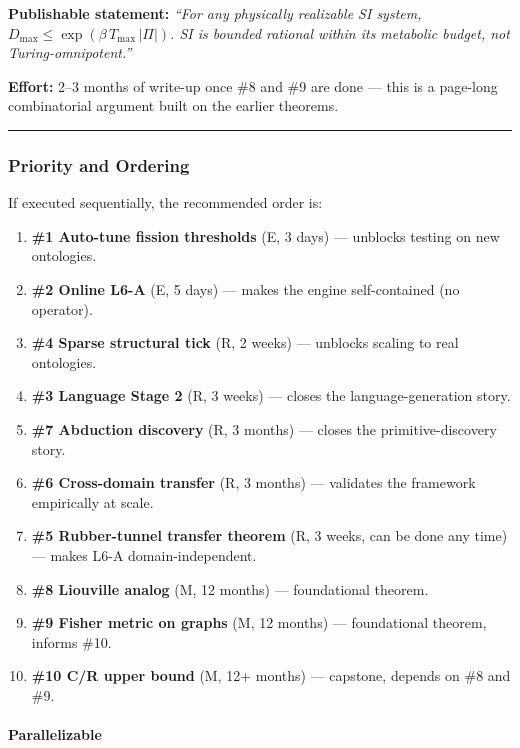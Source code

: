 \documentclass[
  11pt,
  a4paper,
]{article}
\providecommand{\tightlist}{%
  \setlength{\itemsep}{0pt}\setlength{\parskip}{0pt}}
\begin{document}
\textbf{Publishable statement:} \emph{``For any physically realizable SI
system, \(D_\text{max} \leq \exp(\beta \, T_\text{max} \, |\Pi|)\). SI
is bounded rational within its metabolic budget, not
Turing-omnipotent.''}

\textbf{Effort:} 2--3 months of write-up once \#8 and \#9 are done ---
this is a page-long combinatorial argument built on the earlier
theorems.

\begin{center}\rule{0.5\linewidth}{0.5pt}\end{center}

\subsubsection{Priority and Ordering}\label{priority-and-ordering}

If executed sequentially, the recommended order is:

\begin{enumerate}
\def\labelenumi{\arabic{enumi}.}
\tightlist
\item
  \textbf{\#1 Auto-tune fission thresholds} (E, 3 days) --- unblocks
  testing on new ontologies.
\item
  \textbf{\#2 Online L6-A} (E, 5 days) --- makes the engine
  self-contained (no operator).
\item
  \textbf{\#4 Sparse structural tick} (R, 2 weeks) --- unblocks scaling
  to real ontologies.
\item
  \textbf{\#3 Language Stage 2} (R, 3 weeks) --- closes the
  language-generation story.
\item
  \textbf{\#7 Abduction discovery} (R, 3 months) --- closes the
  primitive-discovery story.
\item
  \textbf{\#6 Cross-domain transfer} (R, 3 months) --- validates the
  framework empirically at scale.
\item
  \textbf{\#5 Rubber-tunnel transfer theorem} (R, 3 weeks, can be done
  any time) --- makes L6-A domain-independent.
\item
  \textbf{\#8 Liouville analog} (M, 12 months) --- foundational theorem.
\item
  \textbf{\#9 Fisher metric on graphs} (M, 12 months) --- foundational
  theorem, informs \#10.
\item
  \textbf{\#10 C/R upper bound} (M, 12+ months) --- capstone, depends on
  \#8 and \#9.
\end{enumerate}

\paragraph{Parallelizable}\label{parallelizable-1}
\end{document}
